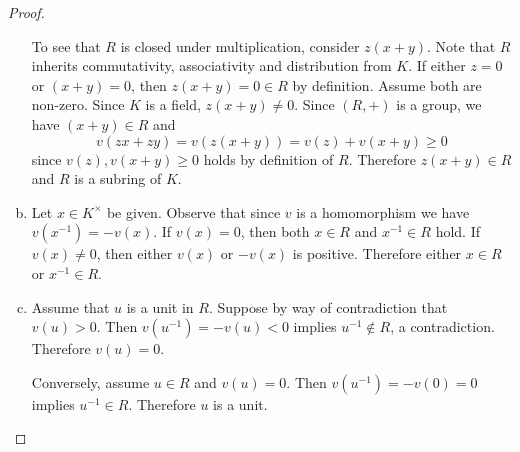 \documentclass[10pt]{amsart}
\begin{document}
\begin{thm}
\begin{proof}
\begin{enumerate}[(a)]
      To see that $R$ is closed under multiplication, consider $z(x + y)$.
      Note that $R$ inherits commutativity, associativity and distribution from $K$.
      If either $z = 0$ or $(x+y) = 0$, then $z(x + y) = 0 \in R$ by definition.
      Assume both are non-zero.
      Since $K$ is a field, $z(x + y) \neq 0$.
      Since $(R, +)$ is a group, we have $(x + y) \in R$ and       
      $$v(zx + zy) = v(z(x+y)) = v(z) + v(x + y) \geq 0$$
      since $v(z), v(x + y) \geq 0$ holds by definition of $R$.
      Therefore $z(x + y) \in R$ and $R$ is a subring of $K$.
    \item
      Let $x \in K^\times$ be given.
      Observe that since $v$ is a homomorphism we have $v(x^{-1}) = -v(x)$.
      If $v(x) = 0$, then both $x \in R$ and $x^{-1} \in R$ hold.
      If $v(x) \neq 0$, then either $v(x)$ or $-v(x)$ is positive.
      Therefore either $x \in R$ or $x^{-1} \in R$.
    \item
      Assume that $u$ is a unit in $R$.
      Suppose by way of contradiction that $v(u) > 0$.
      Then $v(u^{-1}) = -v(u) < 0$ implies $u^{-1} \not \in R$, a contradiction.
      Therefore $v(u) = 0$.
      
      Conversely, assume $u \in R$ and $v(u) = 0$.
      Then $v(u^{-1}) = -v(0) = 0$ implies $u^{-1} \in R$.
      Therefore $u$ is a unit.
    \end{enumerate}
  \end{proof}
\end{thm}
\end{document}
